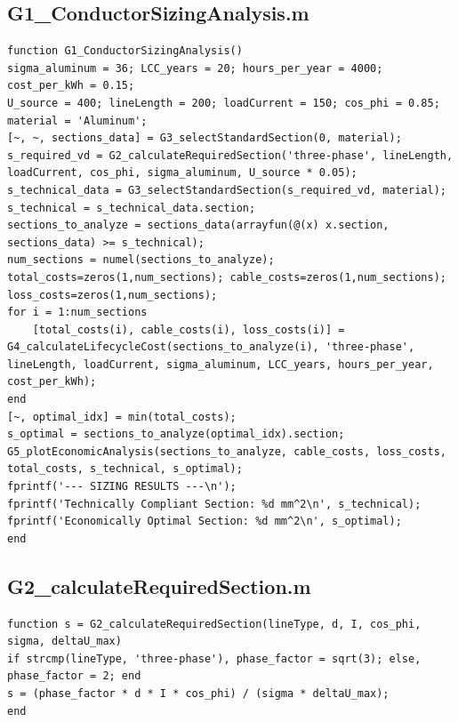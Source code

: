 \documentclass[12pt, a4paper]{article}
\begin{document}
\subsection{G1\_ConductorSizingAnalysis.m}
\begin{lstlisting}[caption={Main script for conductor sizing and economic analysis.}, label={lst:G1}]
function G1_ConductorSizingAnalysis()
sigma_aluminum = 36; LCC_years = 20; hours_per_year = 4000; cost_per_kWh = 0.15;
U_source = 400; lineLength = 200; loadCurrent = 150; cos_phi = 0.85;
material = 'Aluminum';
[~, ~, sections_data] = G3_selectStandardSection(0, material);
s_required_vd = G2_calculateRequiredSection('three-phase', lineLength, loadCurrent, cos_phi, sigma_aluminum, U_source * 0.05);
s_technical_data = G3_selectStandardSection(s_required_vd, material);
s_technical = s_technical_data.section;
sections_to_analyze = sections_data(arrayfun(@(x) x.section, sections_data) >= s_technical);
num_sections = numel(sections_to_analyze);
total_costs=zeros(1,num_sections); cable_costs=zeros(1,num_sections); loss_costs=zeros(1,num_sections);
for i = 1:num_sections
    [total_costs(i), cable_costs(i), loss_costs(i)] = G4_calculateLifecycleCost(sections_to_analyze(i), 'three-phase', lineLength, loadCurrent, sigma_aluminum, LCC_years, hours_per_year, cost_per_kWh);
end
[~, optimal_idx] = min(total_costs);
s_optimal = sections_to_analyze(optimal_idx).section;
G5_plotEconomicAnalysis(sections_to_analyze, cable_costs, loss_costs, total_costs, s_technical, s_optimal);
fprintf('--- SIZING RESULTS ---\n');
fprintf('Technically Compliant Section: %d mm^2\n', s_technical);
fprintf('Economically Optimal Section: %d mm^2\n', s_optimal);
end
\end{lstlisting}

\subsection{G2\_calculateRequiredSection.m}
\begin{lstlisting}[caption={Calculates the minimum required cross-section based on voltage drop.}, label={lst:G2}]
function s = G2_calculateRequiredSection(lineType, d, I, cos_phi, sigma, deltaU_max)
if strcmp(lineType, 'three-phase'), phase_factor = sqrt(3); else, phase_factor = 2; end
s = (phase_factor * d * I * cos_phi) / (sigma * deltaU_max);
end
\end{lstlisting}
\end{document}
